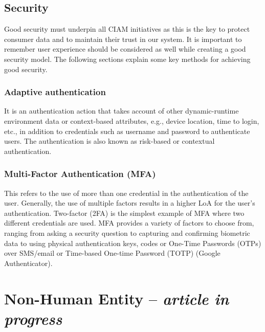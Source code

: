 \hypertarget{security}{%
\section{Security}\label{security}}

Good security must underpin all CIAM initiatives as this is the key to
protect consumer data and to maintain their trust in our system. It is
important to remember user experience should be considered as well while
creating a good security model. The following sections explain some key
methods for achieving good security.

\hypertarget{adaptive-authentication}{%
\subsection{Adaptive authentication}\label{adaptive-authentication}}

It is an authentication action that takes account of other
dynamic-runtime environment data or context-based attributes, e.g.,
device location, time to login, etc., in addition to credentials such as
username and password to authenticate users. The authentication is also
known as risk-based or contextual authentication.

\hypertarget{multi-factor-authentication-mfa}{%
\subsection{Multi-Factor Authentication
(MFA)}\label{multi-factor-authentication-mfa}}

This refers to the use of more than one credential in the authentication
of the user. Generally, the use of multiple factors results in a higher
LoA for the user's authentication. Two-factor (2FA) is the simplest
example of MFA where two different credentials are used. MFA provides a
variety of factors to choose from, ranging from asking a security
question to capturing and confirming biometric data to using physical
authentication keys, codes or One-Time Passwords (OTPs) over SMS/email
or Time-based One-time Password (TOTP) (Google Authenticator).~

\hypertarget{non-human-entity-article-in-progress}{%
\chapter{\texorpdfstring{Non-Human Entity -- \emph{article in
progress}}{Non-Human Entity -- article in progress}}\label{non-human-entity-article-in-progress}}

